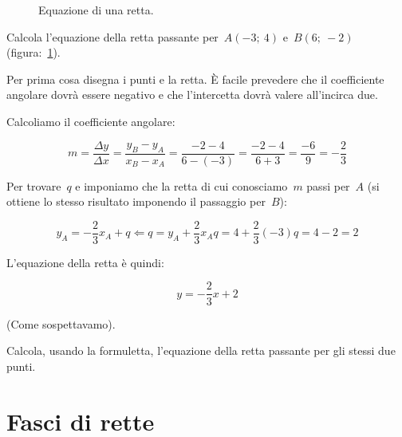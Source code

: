 \begin{exrig}
 \begin{esempio}

  \begin{inaccessibleblock}
 \begin{figure}[h]
    \centering
    \caption{Equazione di una retta.}\label{fig:equazione}
  \end{figure}
\end{inaccessibleblock}

Calcola l'equazione della retta passante per~\(A(-3;~4)\) e~\(B(6;~-2)\) 
(figura:~\ref{fig:equazione}).

Per prima cosa disegna i punti e la retta. È facile prevedere che il 
coefficiente angolare dovrà essere negativo e che l'intercetta dovrà valere
all'incirca due. 

Calcoliamo il coefficiente angolare:

\[m = \frac{\Delta y}{\Delta x} = \frac{y_B - y_A}{x_B - x_A} =
      \frac{-2 - 4}{6 -(-3)} = \frac{-2 - 4}{6 + 3} = \frac{-6}{9} = 
      - \frac{2}{3}
\]

Per trovare~\(q\) e imponiamo che la retta di cui conosciamo~\(m\) passi per~\(A\) 
(si ottiene lo stesso risultato imponendo il passaggio per~\(B\)):

\[y_A = - \frac{2}{3} x_A + q \Leftarrow 
    q = y_A +\frac{2}{3} x_A  
    q = 4 +\frac{2}{3} (-3) 
    q = 4 - 2 = 2 
\]

L'equazione della retta è quindi:

\[y = - \frac{2}{3} x + 2\]

(Come sospettavamo).
 \end{esempio}

% 

 \begin{esempio}
  Calcola, usando la formuletta, l'equazione della retta passante per gli 
  stessi due punti.
 \end{esempio}
\end{exrig}

\section{Fasci di rette}
\label{sec:retta_fasci}

